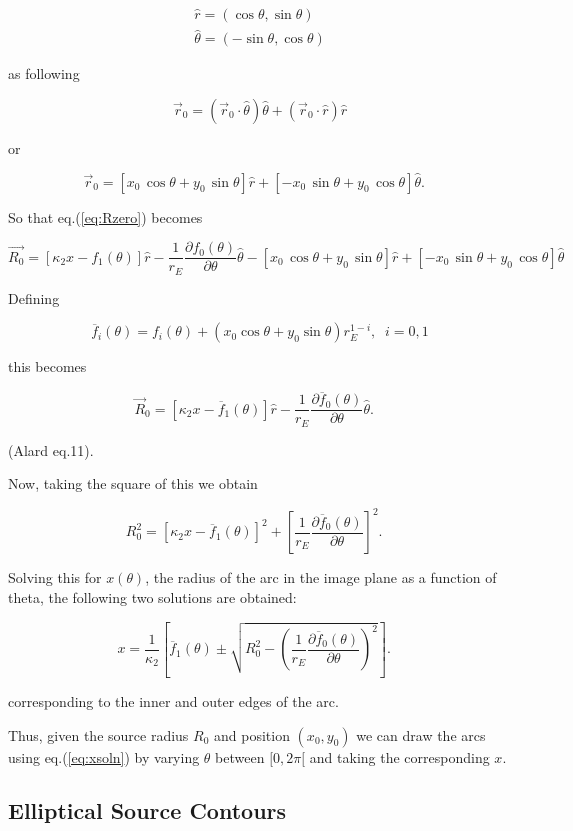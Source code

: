 \documentclass{article}
\def\be{\begin{equation}}
\def\ee{\end{equation}}
\def\bea{\begin{eqnarray}}
\def\eea{\end{eqnarray}}
\def\eqref{eq.(\ref}
\newcommand{\rb}{\right]}
\newcommand{\lb}{\left[}
\def\vecrz{\vec{r}_{0}}
\def\hatr{\hat{r}}
\def\hatth{\hat{\theta}}
\def \te {\theta}
\begin{document}
\bea
\label{eq:unitvs}
\hat{r}=(\cos\te, \sin \te) \\
\hat{\theta}=(-\sin \te, \cos \te)
\eea

 as following

\be
\vecrz = (\vecrz \cdot \hatth) \hatth + (\vecrz \cdot \hatr) \hatr
\ee

or

\be
\label{eq:rzero}
\vec{r}_{0} = \lb x_0 \,  \cos \te + y_0 \,  \sin \te \rb \hat{r} + \lb -x_0 \,  \sin \te + y_0 \,  \cos \te \rb \hat{\theta}.  \;\;\; 
\ee

So that \eqref{eq:Rzero}) becomes

\be
\vec{R_{0}} = \left[ \kappa_2 x - f_{1}(\theta) \right]\hat{r} - \frac{1}{r_E} \frac{\partial f_0(\theta)}{\partial \theta} \hat{\theta} -  \lb x_0 \,  \cos \te + y_0 \,  \sin \te \rb \hat{r} + \lb -x_0 \,  \sin \te + y_0 \,  \cos \te \rb \hat{\theta} \;\;\; 
\ee

Defining 

\be
\overline{f}_i(\theta) = f_i(\theta) + (x_0 \cos \te + y_0 \sin \te)r_{E}^{1-i}, \;\; i=0,1
\ee

this becomes

\be
\vec{R}_{0} = \left[ \kappa_2 x - \overline{f}_{1}(\theta) \right]\hat{r} - \frac{1}{r_E} \frac{\partial \overline{f}_0(\theta)}{\partial \theta} \hat{\theta}. \;\;\; 
\ee

(Alard eq.11).

Now, taking the square of this we obtain

\be
R_{0}^2 = \left[ \kappa_2 x - \overline{f}_{1}(\theta) \right]^2 + \left[\frac{1}{r_E} \frac{\partial \overline{f}_0(\theta)}{\partial \theta}\right]^2. \;\;\; 
\ee

Solving this for $x(\te)$, the radius of the arc in the image plane as
a function of theta, the following two solutions are obtained:

\be
\label{eq:xsoln}
x = \frac{1}{\kappa_2}\left[ \overline{f}_{1}(\theta) \pm \sqrt{R_0^2 - \left( \frac{1}{r_E}\frac{\partial \overline{f}_0(\theta)}{\partial \theta} \right)^2} \right]. \;\;\; 
\ee

corresponding to the inner and outer edges of the arc.

Thus, given the source radius $R_{0}$ and position $(x_0,y_0)$ we can
draw the arcs using \eqref{eq:xsoln}) by varying $\theta$ between
$[0,2\pi[$ and taking the corresponding $x$.


\subsection{Elliptical Source Contours}
\end{document}
